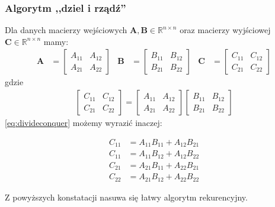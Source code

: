 \subsubsection{Algorytm ,,dziel i rządź''}
Dla danych macierzy wejściowych \(\mathbf{A}, \mathbf{B}\in\mathbb{R}^{n\times n}\) oraz macierzy wyjściowej \(\mathbf{C}\in\mathbb{R}^{n\times n}\) mamy:
\begin{align*}
\mathbf{A}& = \begin{bmatrix} A_{11}& A_{12} \\ A_{21}& A_{22} \end{bmatrix}&
\mathbf{B}& = \begin{bmatrix} B_{11}& B_{12} \\ B_{21}& B_{22} \end{bmatrix}&
\mathbf{C}& = \begin{bmatrix} C_{11}& C_{12} \\ C_{21}& C_{22} \end{bmatrix}
\end{align*}
gdzie
\begin{align}\label{eq:divideconquer}
\begin{bmatrix} C_{11}& C_{12} \\ C_{21}& C_{22}\end{bmatrix}=
\begin{bmatrix} A_{11}& A_{12} \\ A_{21}& A_{22}\end{bmatrix}
\begin{bmatrix} B_{11}& B_{12} \\ B_{21}& B_{22}\end{bmatrix}
\end{align}
\eqref{eq:divideconquer} możemy wyrazić inaczej:

\begin{equation}
\begin{split}
C_{11} &= A_{11}B_{11} + A_{12}B_{21}\\
C_{11} &= A_{11}B_{12} + A_{12}B_{22}\\
C_{21} &= A_{21}B_{11} + A_{22}B_{21}\\
C_{22} &= A_{21}B_{12} + A_{22}B_{22}
\end{split}
\end{equation}

Z powyższych konstatacji nasuwa się łatwy algorytm rekurencyjny.

